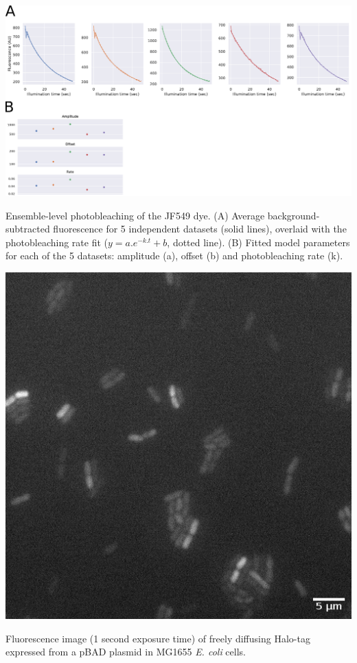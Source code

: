 \begin{suppfigure*}[htbp]
    \begin{center}
    \includegraphics[width=\textwidth]{SI_Figures/SIFig_bleaching.pdf}
    \end{center}
    \caption{Ensemble-level photobleaching of the JF549 dye. (A) Average background-subtracted fluorescence for 5 independent datasets (solid lines), overlaid with the photobleaching rate fit ($y=a.e^{-k.t}+b$, dotted line). (B) Fitted model parameters for each of the 5 datasets: amplitude (a), offset (b) and photobleaching rate (k).}
    \label{SIFig:dye_bleaching}
    \end{suppfigure*}

\begin{suppfigure*}[htbp]
\begin{center}
\includegraphics[width=.5\linewidth]{SI_Figures/Free_Halo_image.png}
\end{center}
\caption{Fluorescence image (1 second exposure time) of freely diffusing Halo-tag expressed from a pBAD plasmid in MG1655 \textit{E. coli} cells.}
\label{SIFig:freehalo_image}
\end{suppfigure*}

